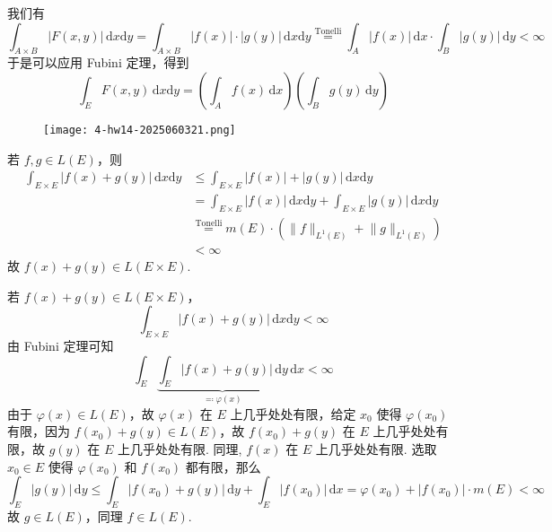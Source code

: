 我们有
\[
\int_{A\times B}^{} \lvert F(x,y) \rvert   \, \mathrm{d}x \mathrm{d}y=\int_{A\times B}^{} \lvert f(x) \rvert \cdot \lvert g(y) \rvert  \, \mathrm{d}x \mathrm{d}y\overset{ \text{Tonelli} }{ = }\int_{A}^{} \lvert f(x) \rvert  \, \mathrm{d}x \cdot \int_{B}^{} \lvert g(y) \rvert  \, \mathrm{d}y<\infty
\]
于是可以应用 Fubini 定理，得到
\[
\int_{E}^{} F(x,y) \, \mathrm{d}x \mathrm{d}y=\left( \int_{A}^{} f(x) \, \mathrm{d}x  \right)\left( \int_{B}^{} g(y) \, \mathrm{d}y  \right)
\]
\begin{exercise}
\begin{figure}[H]
\centering
\texttt{[image: 4-hw14-2025060321.png]}
\label{}
\end{figure}
\end{exercise}
若 $f, g\in L(E)$，则
\[
\begin{aligned}
\int_{E\times E}^{} \lvert f(x)+g(y) \rvert  \, \mathrm{d}x \mathrm{d}y & \leq \int_{E\times E}^{} \lvert f(x) \rvert +\lvert g(y) \rvert  \, \mathrm{d}x \mathrm{d}y \\
 & =\int_{E\times E}^{ } \lvert f(x) \rvert  \, \mathrm{d}x \mathrm{d}y+\int_{E\times E}^{} \lvert g(y) \rvert  \, \mathrm{d}x \mathrm{d}y \\
 & \overset{ \text{Tonelli} }{ = }m(E)\cdot(\lVert f \rVert _{L^{1}(E)}+\lVert g \rVert _{L^{1}(E)})  \\
 & <\infty
\end{aligned}
\]
故 $f (x)+g (y)\in L(E\times E)$.

若 $f (x)+g (y)\in L(E\times E)$，
\[
\int_{E\times E}^{} \lvert f(x)+g(y) \rvert  \, \mathrm{d}x \mathrm{d}y<\infty
\]
由 Fubini 定理可知
\[
\int_{E}^{}\underbrace{  \int_{E}^{} \lvert f(x)+g(y) \rvert  \, \mathrm{d}y  }_{ \eqqcolon \varphi(x) } \, \mathrm{d}x <\infty
\]
由于 $\varphi (x)\in L(E)$，故 $\varphi(x)$ 在 $E$ 上几乎处处有限，给定 $x_0$ 使得 $\varphi(x_0)$ 有限，因为 $f (x_0)+g (y)\in L(E)$，故 $f(x_0)+g(y)$ 在 $E$ 上几乎处处有限，故 $g(y)$ 在 $E$ 上几乎处处有限. 同理, $f(x)$ 在 $E$ 上几乎处处有限. 选取 $x_0\in E$ 使得 $\varphi(x_0)$ 和 $f(x_0)$ 都有限，那么
\[
\int_{E}^{} \lvert g(y) \rvert  \, \mathrm{d}y \leq \int_{E}^{} \lvert f(x_0)+g(y) \rvert  \, \mathrm{d}y +\int_{E}^{} \lvert f(x_0) \rvert  \, \mathrm{d}x =\varphi(x_0)+\lvert f(x_0) \rvert \cdot m(E)<\infty
\]
故 $g\in L(E)$，同理 $f\in L(E)$.

